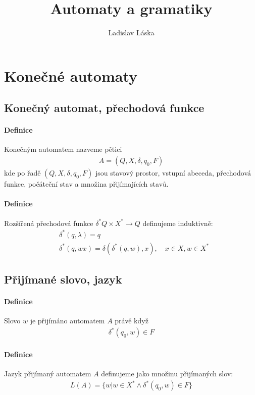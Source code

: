 \documentclass[a4paper,12pt,titlepage]{article}
\title{Automaty a gramatiky}
\author{Ladislav Láska}
\begin{document}
\maketitle
\newpage
\tableofcontents
\newpage

\section{Konečné automaty}
\setcounter{equation}{0}
\subsection{Konečný automat, přechodová funkce}
\setcounter{equation}{0}
\paragraph{Definice}
Konečným automatem nazveme pětici 
\begin{align}
	A = (Q, X, \delta, q_0, F)
\end{align}
kde po řadě $(Q, X, \delta, q_0, F)$ jsou stavový prostor, vstupní abeceda,
přechodová funkce, počáteční stav a množina přijímajících stavů.
\paragraph{Definice}
Rozšířená přechodová funkce $\delta^* Q\times X^* \to Q$ definujeme induktivně:
\begin{align}
	& \delta^*(q, \lambda) = q\\
	&\delta^*(q, wx) = \delta(\delta^*(q, w), x), \quad x \in X, w \in X^*
\end{align}
\subsection{Přijímané slovo, jazyk}
\setcounter{equation}{0}
\paragraph{Definice}
Slovo $w$ je přijímáno automatem $A$ právě když
\begin{align}
	\delta^*(q_0, w) \in F
\end{align}
\paragraph{Definice}
Jazyk přijímaný automatem $A$ definujeme jako množinu přijímaných slov:
\begin{align}
	L(A) = \{w | w \in X^* \land \delta^*(q_0, w) \in F \}
\end{align}
\end{document}
